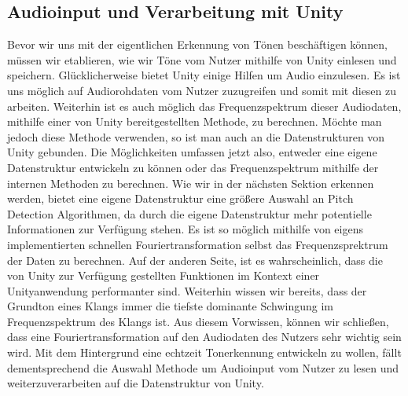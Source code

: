 \subsection{Audioinput und Verarbeitung mit Unity}
Bevor wir uns mit der eigentlichen Erkennung von Tönen beschäftigen können, müssen wir etablieren, wie wir Töne vom Nutzer mithilfe von Unity einlesen und speichern. Glücklicherweise bietet Unity einige Hilfen um Audio einzulesen. Es ist uns möglich auf Audiorohdaten vom Nutzer zuzugreifen und somit mit diesen zu arbeiten. Weiterhin ist es auch möglich das Frequenzspektrum dieser Audiodaten, mithilfe einer von Unity bereitgestellten Methode, zu berechnen. Möchte man jedoch diese Methode verwenden, so ist man auch an die Datenstrukturen von Unity gebunden. Die Möglichkeiten umfassen jetzt also, entweder eine eigene Datenstruktur entwickeln zu können oder das Frequenzspektrum mithilfe der internen Methoden zu berechnen. Wie wir in der nächsten Sektion erkennen werden, bietet eine eigene Datenstruktur eine größere Auswahl an Pitch Detection Algorithmen, da durch die eigene Datenstruktur mehr potentielle Informationen zur Verfügung stehen. Es ist so möglich mithilfe von eigens implementierten schnellen Fouriertransformation selbst das Frequenzsprektrum der Daten zu berechnen. Auf der anderen Seite, ist es wahrscheinlich, dass die von Unity zur Verfügung gestellten Funktionen im Kontext einer Unityanwendung performanter sind. Weiterhin wissen wir bereits, dass der Grundton eines Klangs immer die tiefste dominante Schwingung im Frequenzspektrum des Klangs ist. Aus diesem Vorwissen, können wir schließen, dass eine Fouriertransformation auf den Audiodaten des Nutzers sehr wichtig sein wird. Mit dem Hintergrund eine echtzeit Tonerkennung entwickeln zu wollen, fällt dementsprechend die Auswahl Methode um Audioinput vom Nutzer zu lesen und weiterzuverarbeiten auf die Datenstruktur von Unity. 

